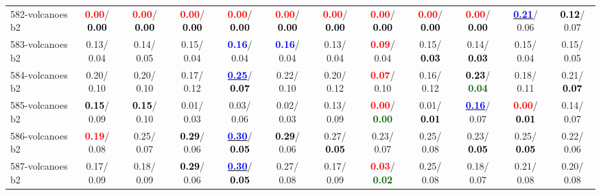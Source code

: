 \begin{table}[h]
\begin{center}
{\begin{tabular}{lc|c|c|c|c|c|c|c|c|c|c}
582-volcanoes b2 & \textcolor{red}{\textbf{  0.00}}/\textcolor{black}{\textbf{  0.00}} & \textcolor{red}{\textbf{  0.00}}/\textcolor{black}{\textbf{  0.00}} & \textcolor{red}{\textbf{  0.00}}/\textcolor{black}{\textbf{  0.00}} & \textcolor{red}{\textbf{  0.00}}/\textcolor{black}{\textbf{  0.00}} & \textcolor{red}{\textbf{  0.00}}/\textcolor{black}{\textbf{  0.00}} & \textcolor{red}{\textbf{  0.00}}/\textcolor{black}{\textbf{  0.00}} & \textcolor{red}{\textbf{  0.00}}/\textcolor{black}{\textbf{  0.00}} & \textcolor{red}{\textbf{  0.00}}/\textcolor{black}{\textbf{  0.00}} & \textcolor{red}{\textbf{  0.00}}/\textcolor{black}{\textbf{  0.00}} & \underline{\textcolor{blue}{\textbf{  0.21}}}/  0.06 & \textcolor{black}{\textbf{  0.12}}/  0.07 \\
583-volcanoes b2 &   0.13/  0.04 &   0.14/  0.05 &   0.15/  0.04 & \textcolor{blue}{\textbf{  0.16}}/  0.04 & \textcolor{blue}{\textbf{  0.16}}/  0.04 &   0.13/  0.04 & \textcolor{red}{\textbf{  0.09}}/  0.04 &   0.15/\textcolor{black}{\textbf{  0.03}} &   0.14/\textcolor{black}{\textbf{  0.03}} &   0.15/  0.04 &   0.15/  0.05 \\ \hline
584-volcanoes b2 &   0.20/  0.10 &   0.20/  0.10 &   0.17/  0.12 & \underline{\textcolor{blue}{\textbf{  0.25}}}/\textcolor{black}{\textbf{  0.07}} &   0.22/  0.10 &   0.20/  0.12 & \textcolor{red}{\textbf{  0.07}}/  0.10 &   0.16/  0.12 & \textcolor{black}{\textbf{  0.23}}/\textcolor{darkgreen}{\textbf{  0.04}} &   0.18/  0.11 &   0.21/\textcolor{black}{\textbf{  0.07}} \\
585-volcanoes b2 & \textcolor{black}{\textbf{  0.15}}/  0.09 & \textcolor{black}{\textbf{  0.15}}/  0.10 &   0.01/  0.03 &   0.03/  0.06 &   0.02/  0.03 &   0.13/  0.09 & \textcolor{red}{\textbf{  0.00}}/\textcolor{darkgreen}{\textbf{  0.00}} &   0.01/\textcolor{black}{\textbf{  0.01}} & \underline{\textcolor{blue}{\textbf{  0.16}}}/  0.07 & \textcolor{red}{\textbf{  0.00}}/\textcolor{black}{\textbf{  0.01}} &   0.14/  0.07 \\
586-volcanoes b2 & \textcolor{red}{\textbf{  0.19}}/  0.08 &   0.25/  0.07 & \textcolor{black}{\textbf{  0.29}}/  0.06 & \underline{\textcolor{blue}{\textbf{  0.30}}}/\textcolor{black}{\textbf{  0.05}} & \textcolor{black}{\textbf{  0.29}}/  0.06 &   0.27/\textcolor{black}{\textbf{  0.05}} &   0.23/  0.07 &   0.25/  0.08 &   0.23/\textcolor{black}{\textbf{  0.05}} &   0.25/\textcolor{black}{\textbf{  0.05}} &   0.22/  0.06 \\
587-volcanoes b2 &   0.17/  0.09 &   0.18/  0.09 & \textcolor{black}{\textbf{  0.29}}/  0.06 & \underline{\textcolor{blue}{\textbf{  0.30}}}/\textcolor{black}{\textbf{  0.05}} &   0.27/  0.08 &   0.17/  0.09 & \textcolor{red}{\textbf{  0.03}}/\textcolor{darkgreen}{\textbf{  0.02}} &   0.25/  0.08 &   0.18/  0.07 &   0.21/  0.08 &   0.20/  0.08 \\

\end{tabular}}
\end{center}
\end{table}
